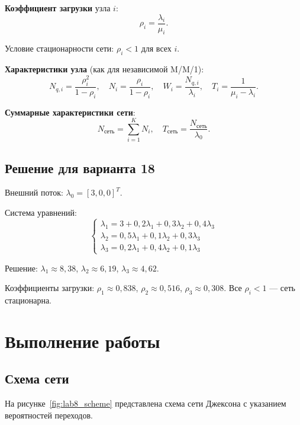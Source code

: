 \textbf{Коэффициент загрузки} узла $i$:
\begin{equation}
    \rho_i = \frac{\lambda_i}{\mu_i}.
\end{equation}

Условие стационарности сети: $\rho_i < 1$ для всех $i$.

\textbf{Характеристики узла} (как для независимой M/M/1):
\begin{equation}
    N_{q,i} = \frac{\rho_i^2}{1 - \rho_i}, \quad N_i = \frac{\rho_i}{1 - \rho_i}, \quad W_i = \frac{N_{q,i}}{\lambda_i}, \quad T_i = \frac{1}{\mu_i - \lambda_i}.
\end{equation}

\textbf{Суммарные характеристики сети}:
\begin{equation}
    N_{\text{сеть}} = \sum_{i=1}^{K} N_i, \quad T_{\text{сеть}} = \frac{N_{\text{сеть}}}{\lambda_0}.
\end{equation}

\subsection{Решение для варианта 18}

Внешний поток: $\lambda_0 = [3, 0, 0]^T$.

Система уравнений:
\[
\begin{cases}
\lambda_1 = 3 + 0{,}2\lambda_1 + 0{,}3\lambda_2 + 0{,}4\lambda_3 \\
\lambda_2 = 0{,}5\lambda_1 + 0{,}1\lambda_2 + 0{,}3\lambda_3 \\
\lambda_3 = 0{,}2\lambda_1 + 0{,}4\lambda_2 + 0{,}1\lambda_3
\end{cases}
\]

Решение: $\lambda_1 \approx 8{,}38$, $\lambda_2 \approx 6{,}19$, $\lambda_3 \approx 4{,}62$.

Коэффициенты загрузки: $\rho_1 \approx 0{,}838$, $\rho_2 \approx 0{,}516$, $\rho_3 \approx 0{,}308$. Все $\rho_i < 1$ — сеть стационарна.

\section{Выполнение работы}

\subsection{Схема сети}

На рисунке~\ref{fig:lab8_scheme} представлена схема сети Джексона с указанием вероятностей переходов.

